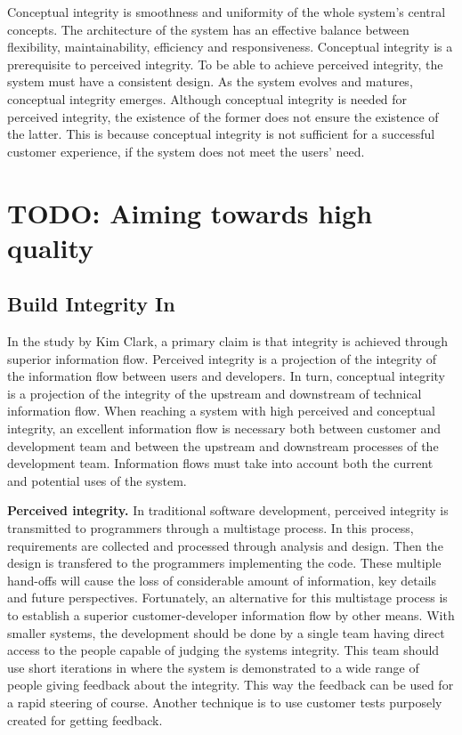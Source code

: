  Conceptual integrity is smoothness and uniformity of the whole system's central concepts. The architecture of the system has an effective balance between flexibility, maintainability, efficiency and responsiveness. Conceptual integrity is a prerequisite to perceived integrity. To be able to achieve perceived integrity, the system must have a consistent design. As the system evolves and matures, conceptual integrity emerges. Although conceptual integrity is needed for perceived integrity, the existence of the former does not ensure the existence of the latter. This is because conceptual integrity is not sufficient for a successful customer experience, if the system does not meet the users' need.~\cite{poppendieck2003LSD}

\section{TODO: Aiming towards high quality}

\subsection{Build Integrity In} 

In the study by Kim Clark, a primary claim is that integrity is achieved through superior information flow. Perceived integrity is a projection of the integrity of the information flow between users and developers. In turn, conceptual integrity is a projection of the integrity of the upstream and downstream of technical information flow. When reaching a system with high perceived and conceptual integrity, an excellent information flow is necessary both between customer and development team and between the upstream and downstream processes of the development team. Information flows must take into account both the current and potential uses of the system.

\textbf{Perceived integrity.} In traditional software development, perceived integrity is transmitted to programmers through a multistage process. In this process, requirements are collected and processed through analysis and design. Then the design is transfered to the programmers implementing the code. These multiple hand-offs will cause the loss of considerable amount of information, key details and future perspectives. Fortunately, an alternative for this multistage process is to establish a superior customer-developer information flow by other means. With smaller systems, the development should be done by a single team having direct access to the people capable of judging the systems integrity. This team should use short iterations in where the system is demonstrated to a wide range of people giving feedback about the integrity. This way the feedback can be used for a rapid steering of course. Another technique is to use customer tests purposely created for getting feedback.

